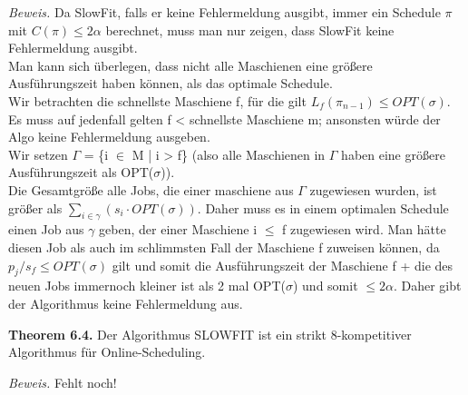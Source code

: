 \textit{Beweis.} Da SlowFit, falls er keine Fehlermeldung ausgibt, immer ein Schedule $\pi$ mit $C(\pi) \le 2 \alpha$ berechnet, muss man nur zeigen, dass SlowFit keine Fehlermeldung ausgibt.\\
Man kann sich überlegen, dass nicht alle Maschienen eine größere Ausführungszeit haben können, als das optimale Schedule. \\
Wir betrachten die schnellste Maschiene f, für die gilt $L_{f}(\pi_{n-1}) \le OPT(\sigma)$. Es muss auf jedenfall gelten f < schnellste Maschiene m; ansonsten würde der Algo keine Fehlermeldung ausgeben.\\
Wir setzen $\Gamma$ = \{i $\in$ M | i > f\} (also alle Maschienen in $\Gamma$ haben eine größere Ausführungszeit als OPT($\sigma$)).\\
Die Gesamtgröße alle Jobs, die einer maschiene aus $\Gamma$ zugewiesen wurden, ist größer als $\sum_{i \in \gamma}(s_{i} \cdot OPT(\sigma))$. Daher muss es in einem optimalen Schedule einen Job aus $\gamma$ geben, der einer Maschiene i $\le$ f zugewiesen wird. Man hätte diesen Job als auch im schlimmsten Fall der Maschiene f zuweisen können, da $p_{j}/s_{f} \le OPT(\sigma)$ gilt und somit die Ausführungszeit der Maschiene f + die des neuen Jobs immernoch kleiner ist als 2 mal OPT($\sigma$) und somit $\le 2\alpha$. Daher gibt der Algorithmus keine Fehlermeldung aus.


\textbf{Theorem 6.4.} Der Algorithmus SLOWFIT ist ein strikt 8-kompetitiver Algorithmus für Online-Scheduling.

\textit{Beweis.} Fehlt noch!
